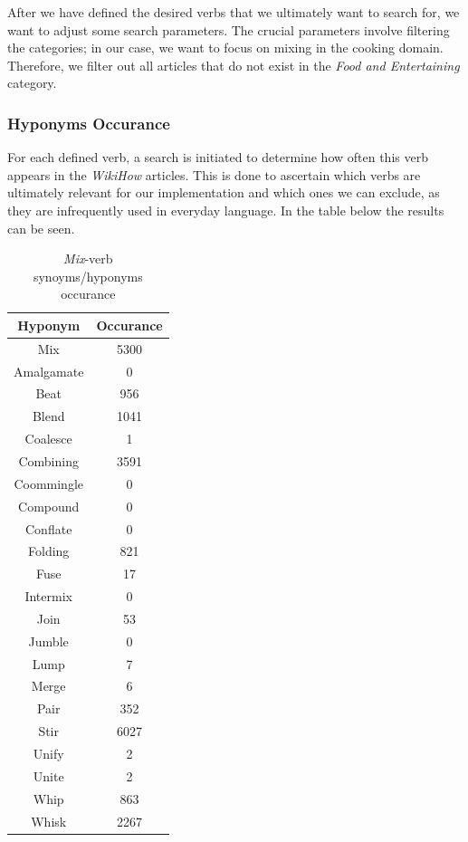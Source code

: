     After we have defined the desired verbs that we ultimately want to search for, we want to adjust some search parameters. The crucial parameters involve filtering the categories; in our case, we want to focus on mixing in the cooking domain. Therefore, we filter out all articles that do not exist in the \textit{Food and Entertaining} category.
  \subsubsection{Hyponyms Occurance}
    For each defined verb, a search is initiated to determine how often this verb appears in the \textit{WikiHow} \cite{wikihow} articles. This is done to ascertain which verbs are ultimately relevant for our implementation and which ones we can exclude, as they are infrequently used in everyday language.
    In the table below the results can be seen.
    \begin{table}[H]
        \centering
        \begin{tabular}{|c|c|}
          \hline
          \textbf{Hyponym} & \textbf{Occurance}  \\
          \hline
          Mix & 5300 \\
          \hline
          Amalgamate & 0 \\
          \hline
          Beat & 956 \\
          \hline
          Blend & 1041 \\
          \hline
          Coalesce & 1 \\
          \hline
          Combining & 3591  \\
          \hline
          Coommingle & 0 \\
          \hline
          Compound & 0 \\
          \hline
          Conflate & 0 \\
          \hline
          Folding & 821 \\
          \hline
          Fuse & 17 \\
          \hline
          Intermix & 0 \\
          \hline
          Join & 53 \\
          \hline
          Jumble & 0 \\
          \hline
          Lump & 7 \\
          \hline
          Merge & 6 \\
          \hline
          Pair & 352 \\
          \hline
          Stir & 6027 \\
          \hline
          Unify & 2 \\
          \hline
          Unite & 2 \\
          \hline
          Whip & 863 \\
          \hline
          Whisk & 2267 \\
          \hline
          
    
        \end{tabular}
        \caption{\textit{Mix}-verb synoyms/hyponyms occurance}
        \label{tab:hyponyms}
      \end{table}
      
